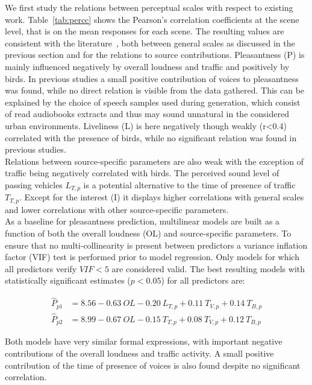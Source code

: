\documentclass[11pt,a4paper]{article}
\begin{document}
We first study the relations between perceptual scales with respect to existing work. Table~\ref{tab:percc} shows the Pearson's correlation coefficients at the scene level, that is on the mean responses for each scene. The resulting values are consistent with the literature~\cite{aumond2017, gontier2018}, both between general scales as discussed in the previous section and for the relations to source contributions. Pleasantness (P) is mainly influenced negatively by overall loudness and traffic and positively by birds. In previous studies a small positive contribution of voices to pleasantness was found, while no direct relation is visible from the data gathered. This can be explained by the choice of speech samples used during generation, which consist of read audiobooks extracts and thus may sound unnatural in the considered urban environments. Liveliness (L) is here negatively though weakly (r<0.4) correlated with the presence of birds, while no significant relation was found in previous studies.\\

Relations between source-specific parameters are also weak with the exception of traffic being negatively correlated with birds. The perceived sound level of passing vehicles $L_{T, p}$ is a potential alternative to the time of presence of traffic $T_{T, p}$. Except for the interest (I) it displays higher correlations with general scales and lower correlations with other source-specific parameters.\\

As a baseline for pleasantness prediction, multilinear models are built as a function of both the overall loudness (OL) and source-specific parameters. To ensure that no multi-collinearity is present between predictors a variance inflation factor (VIF) test is performed prior to model regression. Only models for which all predictors verify $VIF<5$ are considered valid. The best resulting models with statistically significant estimates ($p<0.05$) for all predictors are:

\begin{align}
\hat P_{p1} &= 8.56 - 0.63~OL - 0.20~L_{T, p} + 0.11~T_{V, p} + 0.14~T_{B, p}\\
\hat P_{p2} &= 8.99 - 0.67~OL - 0.15~T_{T, p} + 0.08~T_{V, p} + 0.12~T_{B, p}
\end{align}

Both models have very similar formal expressions, with important negative contributions of the overall loudness and traffic activity. A small positive contribution of the time of presence of voices is also found despite no significant correlation.\\
\end{document}
